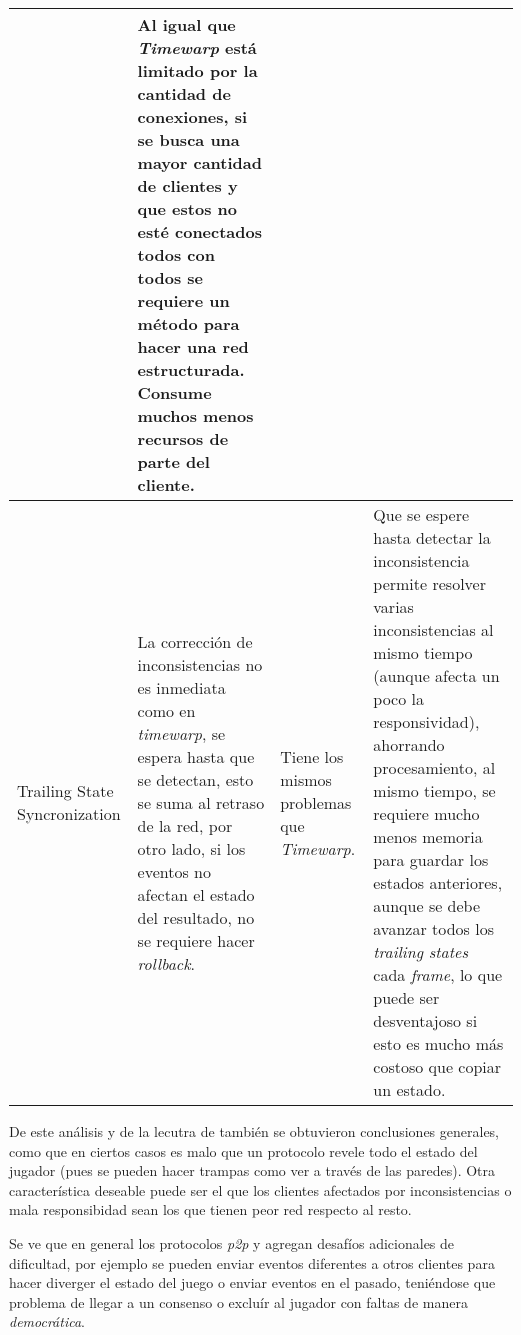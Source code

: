 \begin{longtable}{|p{2cm}|p{4cm}|p{4cm}|p{4cm}|}
&
Al igual que \emph{Timewarp} está limitado por la cantidad de conexiones, si se busca una mayor cantidad de clientes y que estos no esté conectados todos con todos se requiere un método para hacer una red estructurada.
\newline Consume muchos menos recursos de parte del cliente.
\\ \hline
Trailing State Syncronization
&
La corrección de inconsistencias no es inmediata como en \emph{timewarp}, se espera hasta que se detectan, esto se suma al retraso de la red, por otro lado, si los eventos no afectan el estado del resultado, no se requiere hacer \emph{rollback}.
&
Tiene los mismos problemas que \emph{Timewarp}.
&
Que se espere hasta detectar la inconsistencia permite resolver varias inconsistencias al mismo tiempo (aunque afecta un poco la responsividad), ahorrando procesamiento, al mismo tiempo, se requiere mucho menos memoria para guardar los estados anteriores, aunque se debe avanzar todos los \emph{trailing states} cada \emph{frame}, lo que puede ser desventajoso si esto es mucho más costoso que copiar un estado.
\\ \hline
\end{longtable}
\normalsize

De este análisis y de la lecutra de \cite{hu2008imewarpty} también se obtuvieron conclusiones generales, como que en ciertos casos es malo que un protocolo revele todo el estado del jugador (pues se pueden hacer trampas como ver a través de las paredes). Otra característica deseable puede ser el que los clientes afectados por inconsistencias o mala responsibidad sean los que tienen peor red respecto al resto.

Se ve que en general los protocolos \emph{p2p} y agregan desafíos adicionales de dificultad, por ejemplo se pueden enviar eventos diferentes a otros clientes para hacer diverger el estado del juego o enviar eventos en el pasado, teniéndose que problema de llegar a un consenso o excluír al jugador con faltas de manera \emph{democrática}.


